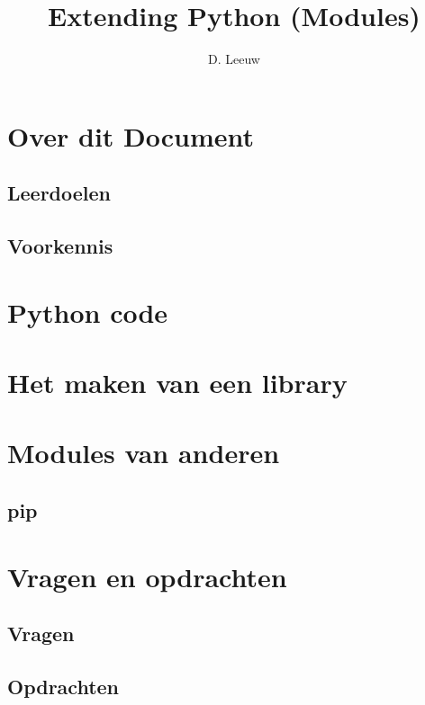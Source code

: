 \documentclass[a4paper,12pt,twoside,openright,titlepage]{article}
\author{D. Leeuw}
\title{Extending Python (Modules)}
\date{\today\\
\vfill
\raggedright
\copyright\ 2020-2025 Dennis Leeuw\\
}
\begin{document}

\maketitle


\section{Over dit Document}
\subsection{Leerdoelen}

\subsection{Voorkennis}




\section{Python code}


\section{Het maken van een library}


\section{Modules van anderen}

\subsection{pip}


\section{Vragen en opdrachten}
\subsection{Vragen}

\subsection{Opdrachten}


\printindex
\end{document}
